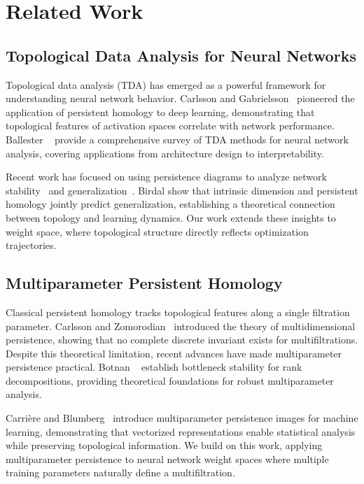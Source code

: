 \section{Related Work}
\label{sec:related}

\subsection{Topological Data Analysis for Neural Networks}

Topological data analysis (TDA) has emerged as a powerful framework for understanding neural network behavior. Carlsson and Gabrielsson~\cite{carlssonTopologicalApproachesDeep2018} pioneered the application of persistent homology to deep learning, demonstrating that topological features of activation spaces correlate with network performance. Ballester \etal~\cite{ballesterTopologicalDataAnalysis2024} provide a comprehensive survey of TDA methods for neural network analysis, covering applications from architecture design to interpretability.

Recent work has focused on using persistence diagrams to analyze network stability~\cite{akaiExperimentalStabilityAnalysis2021} and generalization~\cite{birdalIntrinsicDimensionPersistent2021}. Birdal \etal show that intrinsic dimension and persistent homology jointly predict generalization, establishing a theoretical connection between topology and learning dynamics. Our work extends these insights to weight space, where topological structure directly reflects optimization trajectories.

\subsection{Multiparameter Persistent Homology}

Classical persistent homology tracks topological features along a single filtration parameter. Carlsson and Zomorodian~\cite{carlssonTheoryMultidimensionalPersistence2009} introduced the theory of multidimensional persistence, showing that no complete discrete invariant exists for multifiltrations. Despite this theoretical limitation, recent advances have made multiparameter persistence practical. Botnan \etal~\cite{botnanBottleneckStabilityRank2024} establish bottleneck stability for rank decompositions, providing theoretical foundations for robust multiparameter analysis.

Carrière and Blumberg~\cite{carriereMultiparameterPersistenceImages} introduce multiparameter persistence images for machine learning, demonstrating that vectorized representations enable statistical analysis while preserving topological information. We build on this work, applying multiparameter persistence to neural network weight spaces where multiple training parameters naturally define a multifiltration.

